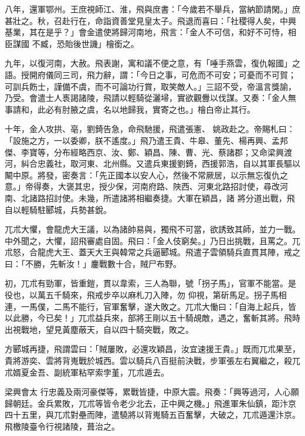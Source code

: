 \begin{pinyinscope}
 八年，還軍鄂州。王庶視師江、淮，飛與庶書：「今歲若不舉兵，當納節請閑。」庶甚壯之。秋，召赴行在，命詣資善堂見皇太子。飛退而喜曰：「社稷得人矣，中興基業，其在是乎？」會金遣使將歸河南地，飛言：「金人不可信，和好不可恃，相臣謀國
 不臧，恐貽後世譏」檜銜之。



 九年，以復河南，大赦。飛表謝，寓和議不便之意，有「唾手燕雲，復仇報國」之語。授開府儀同三司，飛力辭，謂：「今日之事，可危而不可安；可憂而不可賀；可訓兵飭士，謹備不虞，而不可論功行賞，取笑敵人。」三詔不受，帝溫言獎諭，乃受。會遣士人褭謁諸陵，飛請以輕騎從灑埽，實欲觀釁以伐謀。又奏：「金人無事請和，此必有肘腋之虞，名以地歸我，實寄之也。」檜白帝止其行。



 十年，金人攻拱、亳，劉錡告急，命飛馳援，飛遣張憲、
 姚政赴之。帝賜札曰：「設施之方，一以委卿，朕不遙度。」飛乃遣王貴、牛皋、董先、楊再興、孟邦傑、李寶等，分布經略西京、汝、鄭、穎昌、陳、曹、光、蔡諸郡；又命梁興渡河，糾合忠義社，取河東、北州縣。又遣兵東援劉錡，西援郭浩，自以其軍長驅以闞中原。將發，密奏言：「先正國本以安人心，然後不常厥居，以示無忘復仇之意。」帝得奏，大褒其忠，授少保，河南府路、陜西、河東北路招討使，尋改河南、北諸路招討使。未幾，所遣諸將相繼奏捷。大軍在穎昌，諸
 將分道出戰，飛自以輕騎駐郾城，兵勢甚銳。



 兀朮大懼，會龍虎大王議，以為諸帥易與，獨飛不可當，欲誘致其師，並力一戰。中外聞之，大懼，詔飛審處自固。飛曰：「金人伎窮矣。」乃日出挑戰，且罵之。兀朮怒，合龍虎大王、蓋天大王與韓常之兵逼郾城。飛遣子雲領騎兵直貫其陣，戒之曰：「不勝，先斬汝！」鏖戰數十合，賊尸布野。



 初，兀朮有勁軍，皆重鎧，貫以韋索，三人為聯，號「拐子馬」，官軍不能當。是役也，以萬五千騎來，飛戒步卒以麻札刀入陣，勿
 仰視，第斫馬足。拐子馬相連，一馬僕，二馬不能行，官軍奮擊，遂大敗之。兀朮大慟曰：「自海上起兵，皆以此勝，今已矣！」兀朮益兵來，部將王剛以五十騎覘敵，遇之，奮斬其將。飛時出視戰地，望見黃塵蔽天，自以四十騎突戰，敗之。



 方郾城再捷，飛謂雲曰：「賊屢敗，必還攻穎昌，汝宜速援王貴。」既而兀朮果至，貴將游奕、雲將背嵬戰於城西。雲以騎兵八百挺前決戰，步軍張左右翼繼之，殺兀朮婿夏金吾、副統軍粘罕索孛堇，兀朮遁去。



 梁興會太
 行忠義及兩河豪傑等，累戰皆捷，中原大震。飛奏：「興等過河，人心願歸朝廷。金兵累敗，兀朮等皆令老少北去，正中興之機。」飛進軍朱仙鎮，距汴京四十五里，與兀朮對壘而陣，遣驍將以背嵬騎五百奮擊，大破之，兀朮遁還汴京。飛檄陵臺令行視諸陵，葺治之。




\end{pinyinscope}

